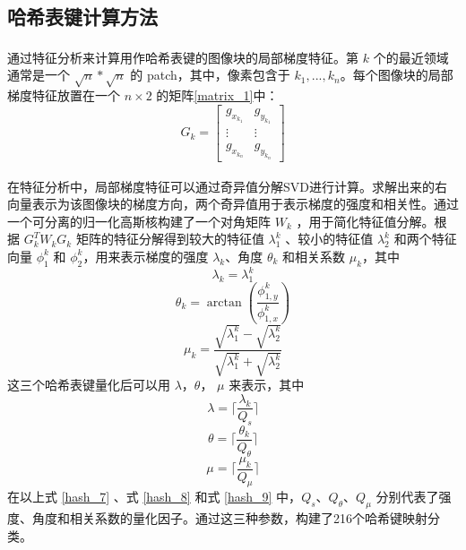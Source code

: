 \documentclass[12pt, a4paper, oneside]{ctexbook}
\begin{document}
	\subsection{哈希表键计算方法}
	通过特征分析\textsuperscript{\cite{6}}来计算用作哈希表键的图像块的局部梯度特征。第 $k$ 个的最近领域通常是一个 $\sqrt{n}*\sqrt{n}$ 的 patch，其中，像素包含于 $k_1,...,k_n$。每个图像块的局部梯度特征放置在一个 $n \times 2$ 的矩阵\ref{matrix_1}中：
	\begin{equation}
	G_k=
	\left[
	\begin{matrix}
		{g_{x_{k_1}}} & {g_{y_{k_1}}}\\
		\vdots & \vdots\\
		{g_{x_{k_n}}} & {g_{y_{k_n}}}
	\end{matrix}
	\right]\label{matrix_1}
	\end{equation}
	\par 在特征分析\textsuperscript{\cite{6}}中，局部梯度特征可以通过奇异值分解SVD进行计算。求解出来的右向量表示为该图像块的梯度方向，两个奇异值用于表示梯度的强度和相关性。通过一个可分离的归一化高斯核构建了一个对角矩阵 $W_k$ ，用于简化特征值分解。根据 $G_k^TW_kG_k$ 矩阵的特征分解得到较大的特征值 $\lambda_1^k$ 、较小的特征值 $\lambda_2^k$ 和两个特征向量 $\phi_1^k$ 和 $\phi_2^k$，用来表示梯度的强度 $\lambda_k$、角度 $\theta_k$ 和相关系数 $\mu_k$，其中
	\begin{equation}
		\lambda_k=\lambda_1^k
	\end{equation}
	\begin{equation}
		\theta_k=\arctan(\frac{\phi_{1,y}^k}{\phi_{1,x}^k}) 
	\end{equation}
	\begin{equation}
		\mu_k=\frac{\sqrt{\lambda_1^k}-\sqrt{\lambda_2^k}}{\sqrt{\lambda_1^k}+\sqrt{\lambda_2^k}} 
	\end{equation}
	这三个哈希表键量化后可以用 $\lambda$，$\theta$， $\mu$ 来表示，其中
	\begin{equation}
		\lambda=\lceil\frac{\lambda_k}{Q_s}\rceil		\label{hash_7}
	\end{equation}
	\begin{equation}
		\theta=\lceil\frac{\theta_k}{Q_\theta}\rceil	\label{hash_8}
	\end{equation}
	\begin{equation}
		\mu=\lceil\frac{\mu_k}{Q_\mu}\rceil				\label{hash_9}
	\end{equation}
	在以上式 \ref{hash_7} 、式 \ref{hash_8} 和式 \ref{hash_9} 中，$Q_s$、$Q_\theta$、$Q_\mu$ 分别代表了强度、角度和相关系数的量化因子。通过这三种参数，构建了216个哈希键映射分类。
	
\end{document}
